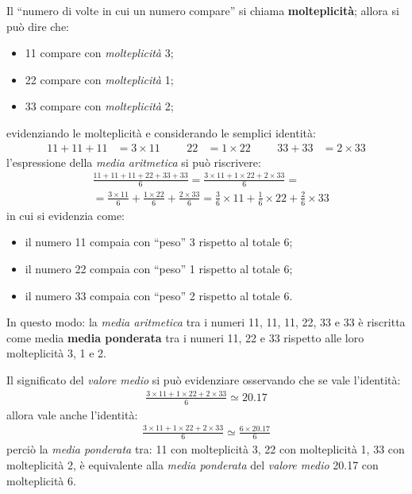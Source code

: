 \documentclass[12pt,a4paper]{article}
\newcommand{\Virgolette}[1]{``#1''}
\begin{document}
Il \Virgolette{numero di volte in cui un  numero compare} si chiama \textbf{molteplicità}; allora si
può dire che:
\begin{itemize}
\item \num{11} compare con \emph{molteplicità} \num{3};
\item \num{22} compare con \emph{molteplicità} \num{1};
\item \num{33} compare con \emph{molteplicità} \num{2};
\end{itemize}
evidenziando le molteplicità e considerando le semplici identità:
\begin{align*}
  \num{11} + \num{11} + \num{11} &= \num{3} \times{} \num{11} &&&
  \num{22} &= \num{1} \times{} \num{22} &&&
  \num{33} + \num{33} &= \num{2} \times{} \num{33}
\end{align*}
l'espressione della \emph{media aritmetica} si può riscrivere:
\begin{align*}
  &\frac{\num{11} + \num{11} + \num{11} + \num{22} + \num{33} + \num{33}}{6}
  = \frac{\num{3} \times{} \num{11}
    + \num{1} \times{} \num{22}
    + \num{2} \times{} \num{33}}
    {6} = \\
  &=
    \frac{\num{3} \times{} \num{11}}{6} +
    \frac{\num{1} \times{} \num{22}}{6} +
    \frac{\num{2} \times{} \num{33}}{6}
  =
    \frac{\num{3}}{6} \times{} \num{11} +
    \frac{\num{1}}{6} \times{} \num{22} +
    \frac{\num{2}}{6} \times{} \num{33}
\end{align*}
in cui si evidenzia come:
\begin{itemize}
\item il numero \num{11} compaia con ``peso'' \num{3} rispetto al totale \num{6};
\item il numero \num{22} compaia con ``peso'' \num{1} rispetto al totale \num{6};
\item il numero \num{33} compaia con ``peso'' \num{2} rispetto al totale \num{6}.
\end{itemize}

In questo  modo: la  \emph{media aritmetica}  tra i numeri  \num{11}, \num{11},  \num{11}, \num{22},
\num{33} e \num{33} è riscritta come media  \textbf{media ponderata} tra i numeri \num{11}, \num{22}
e \num{33} rispetto alle loro molteplicità \num{3}, \num{1} e \num{2}.

Il significato del \emph{valore medio} si può evidenziare osservando che se vale l'identità:
\begin{align*}
  \frac{\num{3} \times{} \num{11} + \num{1} \times{} \num{22}
  + \num{2} \times{} \num{33}}{\num{6}}
  \simeq \num{20,17}
\end{align*}
allora vale anche l'identità:
\begin{align*}
  \frac{\num{3} \times{} \num{11} + \num{1} \times{} \num{22}
  + \num{2} \times{} \num{33}}{\num{6}}
  \simeq \frac{\num{6} \times{} \num{20,17}}{\num{6}}
\end{align*}
perciò la \emph{media  ponderata} tra: \num{11} con molteplicità \num{3},  \num{22} con molteplicità
\num{1},  \num{33}  con  molteplicità  \num{2},   è  equivalente  alla  \emph{media  ponderata}  del
\emph{valore medio} \num{20,17} con molteplicità \num{6}.
\end{document}
